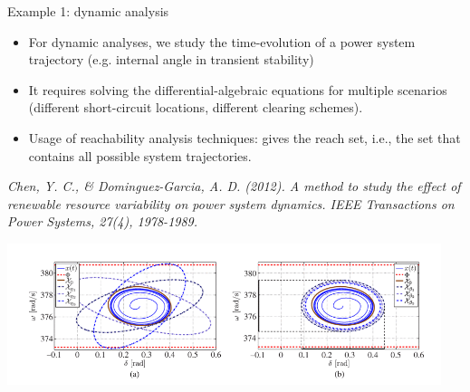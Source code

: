 \begin{frame}[allowframebreaks]{Example 1: dynamic analysis}
\begin{itemize}
    \item For dynamic analyses, we study the time-evolution of a power system trajectory (e.g. internal angle in transient stability)
    \item It requires solving the differential-algebraic equations for multiple scenarios (different short-circuit locations, different clearing schemes).
    \item Usage of reachability analysis techniques: gives the reach set, i.e., the set that contains all possible system trajectories.
\end{itemize}
\emph{Chen, Y. C., \& Dominguez-Garcia, A. D. (2012). A method to study the effect of renewable resource variability on power system dynamics. IEEE Transactions on Power Systems, 27(4), 1978-1989.}
\begin{center}
\includegraphics[width=0.95\textwidth]{images/ReachAn.png}
\end{center}
\end{frame}


